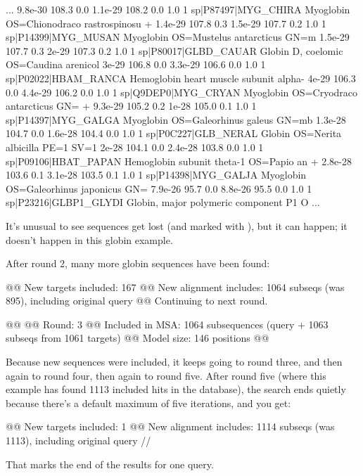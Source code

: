 \begin{sreoutput}
...
    9.8e-30  108.3   0.0    1.1e-29  108.2   0.0    1.0  1  sp|P87497|MYG_CHIRA   Myoglobin OS=Chionodraco rastrospinosu
+   1.4e-29  107.8   0.3    1.5e-29  107.7   0.2    1.0  1  sp|P14399|MYG_MUSAN   Myoglobin OS=Mustelus antarcticus GN=m
    1.5e-29  107.7   0.3      2e-29  107.3   0.2    1.0  1  sp|P80017|GLBD_CAUAR  Globin D, coelomic OS=Caudina arenicol
      3e-29  106.8   0.0    3.3e-29  106.6   0.0    1.0  1  sp|P02022|HBAM_RANCA  Hemoglobin heart muscle subunit alpha-
      4e-29  106.3   0.0    4.4e-29  106.2   0.0    1.0  1  sp|Q9DEP0|MYG_CRYAN   Myoglobin OS=Cryodraco antarcticus GN=
+   9.3e-29  105.2   0.2      1e-28  105.0   0.1    1.0  1  sp|P14397|MYG_GALGA   Myoglobin OS=Galeorhinus galeus GN=mb 
    1.3e-28  104.7   0.0    1.6e-28  104.4   0.0    1.0  1  sp|P0C227|GLB_NERAL   Globin OS=Nerita albicilla PE=1 SV=1
      2e-28  104.1   0.0    2.4e-28  103.8   0.0    1.0  1  sp|P09106|HBAT_PAPAN  Hemoglobin subunit theta-1 OS=Papio an
+   2.8e-28  103.6   0.1    3.1e-28  103.5   0.1    1.0  1  sp|P14398|MYG_GALJA   Myoglobin OS=Galeorhinus japonicus GN=
    7.9e-26   95.7   0.0    8.8e-26   95.5   0.0    1.0  1  sp|P23216|GLBP1_GLYDI Globin, major polymeric component P1 O
...
\end{sreoutput}

It's unusual to see sequences get lost (and marked with \ccode{-}),
but it can happen; it doesn't happen in this globin example.

After round 2, many more globin sequences have been found:

\begin{sreoutput}
@@ New targets included:   167
@@ New alignment includes: 1064 subseqs (was 895), including original query
@@ Continuing to next round.

@@
@@ Round:                  3
@@ Included in MSA:        1064 subsequences (query + 1063 subseqs from 1061 targets)
@@ Model size:             146 positions
@@
\end{sreoutput}

Because new sequences were included, it keeps going to round three,
and then again to round four, then again to round five. After round
five (where this example has found 1113 included hits in the
database), the search ends quietly because there's a default maximum
of five iterations, and you get:

\begin{sreoutput}
@@ New targets included:   1
@@ New alignment includes: 1114 subseqs (was 1113), including original query
//
\end{sreoutput}

That \ccode{//} marks the end of the results for one query.










